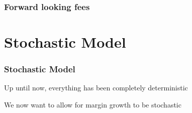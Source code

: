 \documentclass[10pt]{beamer}
\begin{document}
  \begin{frame} \frametitle{Forward looking fees}

    \begin{figure}
      \label{fig:dg_tax_growth}
    \end{figure}

  \end{frame}


\section{Stochastic Model}

  \begin{frame} \frametitle{Stochastic Model}

    Up until now, everything has been completely deterministic

    \vspace{0.25cm}

    We now want to allow for margin growth to be stochastic

  \end{frame}
\end{document}
